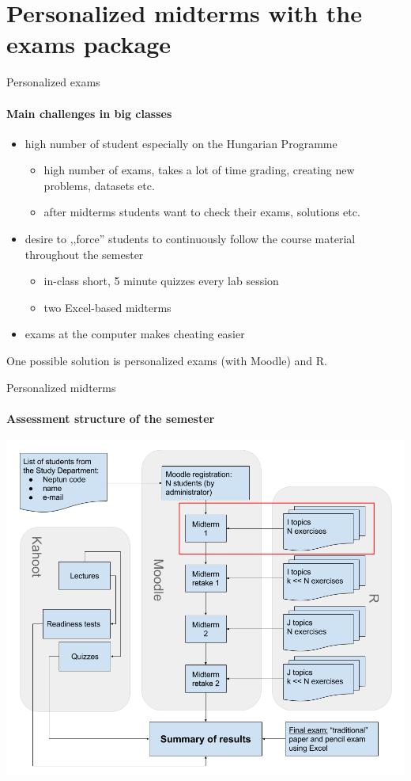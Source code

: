 \documentclass[10pt]{beamer}
\begin{document}
\section{Personalized midterms with the exams package}


\begin{frame}{Personalized exams}
\framesubtitle{Main challenges in big classes}
\begin{itemize}
\item high number of student especially on the Hungarian Programme
\begin{itemize}
\item high number of exams, takes a lot of time grading, creating new problems, datasets etc.
\item after midterms students want to check their exams, solutions etc.
\end{itemize}
\item desire to ,,force'' students to continuously follow the course material throughout the semester
\begin{itemize}
\item in-class short, 5 minute quizzes every lab session
\item two Excel-based midterms
\end{itemize}
\item exams at the computer makes cheating easier
\end{itemize}
One possible solution is personalized exams (with Moodle) and R.
\end{frame}

\begin{frame}{Personalized midterms}
\framesubtitle{Assessment structure of the semester}
\begin{center}
\includegraphics[scale = .25]{graph/semester_workflow_eng.png}
\end{center}
\end{frame}
\end{document}

